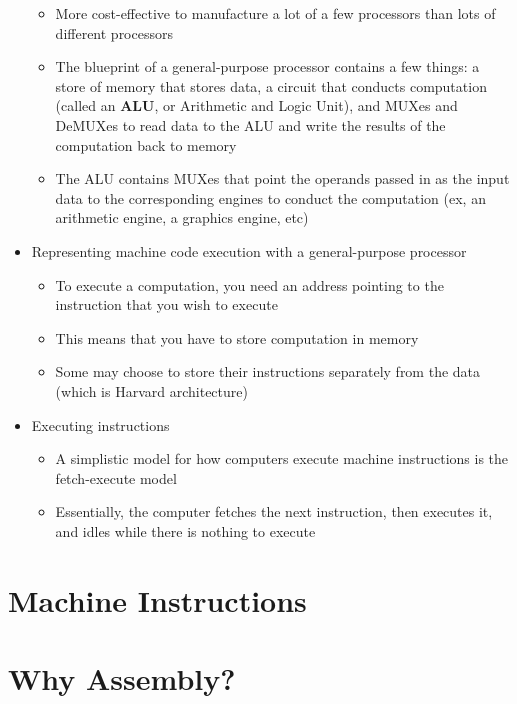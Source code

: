 \documentclass{article}
\begin{document}
\begin{itemize}
\begin{itemize}
			\item More cost-effective to manufacture a lot of a few processors than lots of different processors
			\item The blueprint of a general-purpose processor contains a few things: a store of memory that stores data, a circuit that conducts computation (called an \textbf{ALU}, or Arithmetic and Logic Unit), and MUXes and DeMUXes to read data to the ALU and write the results of the computation back to memory
			\item The ALU contains MUXes that point the operands passed in as the input data to the corresponding engines to conduct the computation (ex, an arithmetic engine, a graphics engine, etc)
		\end{itemize}
	\item Representing machine code execution with a general-purpose processor
		\begin{itemize}
			\item To execute a computation, you need an address pointing to the instruction that you wish to execute
			\item This means that you have to store computation in memory
			\item Some may choose to store their instructions separately from the data (which is Harvard architecture)
		\end{itemize}
	\item Executing instructions
		\begin{itemize}
			\item A simplistic model for how computers execute machine instructions is the fetch-execute model
			\item Essentially, the computer fetches the next instruction, then executes it, and idles while there is nothing to execute
		\end{itemize}
\end{itemize}

\section{Machine Instructions}

\section{Why Assembly?}
\end{document}
